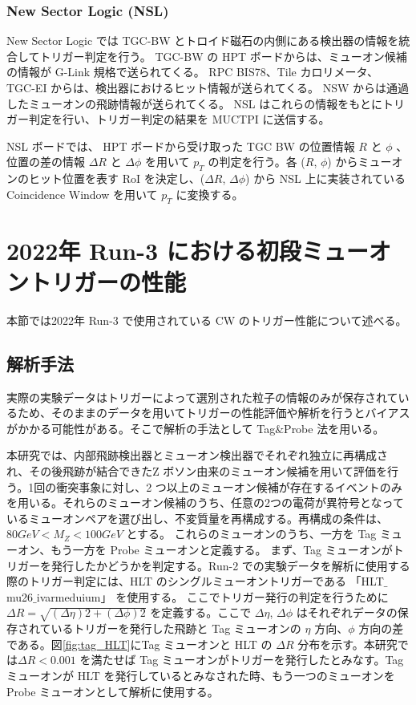 \subsubsection{New Sector Logic (NSL)}
New Sector Logic では TGC-BW とトロイド磁石の内側にある検出器の情報を統合してトリガー判定を行う。
TGC-BW の HPT ボードからは、ミューオン候補の情報が G-Link 規格で送られてくる。
RPC BIS78、Tile カロリメータ、 TGC-EI からは、検出器におけるヒット情報が送られてくる。
NSW からは通過したミューオンの飛跡情報が送られてくる。
NSL はこれらの情報をもとにトリガー判定を行い、トリガー判定の結果を MUCTPI に送信する。

NSL ボードでは、 HPT ボードから受け取った TGC BW の位置情報 $R$ と $\phi$ 、位置の差の情報 $\Delta R$ と $\Delta \phi$ を用いて $p_T$ の判定を行う。各 ($R$, $\phi$) からミューオンのヒット位置を表す RoI を決定し、($\Delta R$, $\Delta \phi$) から NSL 上に実装されている Coincidence Window を用いて $p_T$ に変換する。






\section{2022年 Run-3 における初段ミューオントリガーの性能}
本節では2022年 Run-3 で使用されている CW のトリガー性能について述べる。

\subsection{解析手法}
実際の実験データはトリガーによって選別された粒子の情報のみが保存されているため、そのままのデータを用いてトリガーの性能評価や解析を行うとバイアスがかかる可能性がある。そこで解析の手法として Tag$\&$Probe 法を用いる。

本研究では、内部飛跡検出器とミューオン検出器でそれぞれ独立に再構成され、その後飛跡が結合できたZ ボソン由来のミューオン候補を用いて評価を行う。1回の衝突事象に対し、2 つ以上のミューオン候補が存在するイベントのみを用いる。それらのミューオン候補のうち、任意の2つの電荷が異符号となっているミューオンペアを選び出し、不変質量を再構成する。再構成の条件は、$80 GeV < M_Z < 100 GeV$ とする。
これらのミューオンのうち、一方を Tag ミューオン、もう一方を Probe ミューオンと定義する。
まず、Tag ミューオンがトリガーを発行したかどうかを判定する。Run-2 での実験データを解析に使用する際のトリガー判定には、HLT のシングルミューオントリガーである 「HLT$\_$mu26$\_$ivarmeduium」 を使用する。
ここでトリガー発行の判定を行うために $\Delta R = \sqrt{(\Delta \eta)2 + (\Delta \phi)2}$ を定義する。ここで $\Delta \eta$, $\Delta \phi$ はそれぞれデータの保存されているトリガーを発行した飛跡と Tag ミューオンの $\eta$ 方向、$\phi$ 方向の差である。図\ref{fig:tag_HLT}にTag ミューオンと HLT の $\Delta R$ 分布を示す。本研究では$\Delta R < 0.001$ を満たせば Tag ミューオンがトリガーを発行したとみなす。Tag ミューオンが HLT を発行しているとみなされた時、もう一つのミューオンを Probe ミューオンとして解析に使用する。

